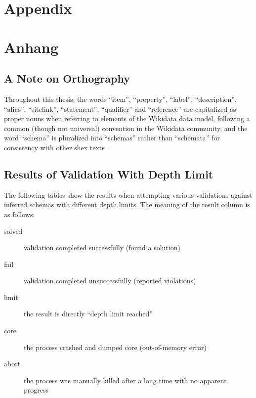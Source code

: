 
{\chapter{Appendix}}    %
{\chapter{Anhang}}      %
\label{chap:appendix}

\section{A Note on Orthography}

Throughout this thesis,
the words “\gls{item}”, “\gls{property}”,
“\gls{label}”, “\gls{description}”, “\gls{alias}”,
“\gls{sitelink}”,
“\gls{statement}”, “\gls{qualifier}” and “\gls{reference}”
are capitalized as proper nouns when referring to elements of the \gls{Wikidata} data model,
following a common (though not universal) convention in the \gls{Wikidata} community,
and the word “\gls{schema}” is pluralized into “\glspl{schema}”
rather than “schemata”
for consistency with other \gls{shex} texts \cite{shex,shex-primer}.

\section{Results of Validation With Depth Limit}
\label{sec:appendix:depth-limit}

The following tables show the results
when attempting various validations against inferred \glspl{schema}
with different depth limits.
The meaning of the result column is as follows:

\begin{description}
\item[solved] validation completed successfully (found a solution)
\item[fail] validation completed unsuccessfully (reported violations)
\item[limit] the result is directly “depth limit reached” %
\item[core] the process crashed and dumped core (out-of-memory error)
\item[abort] the process was manually killed after a long time with no apparent progress
\end{description}

